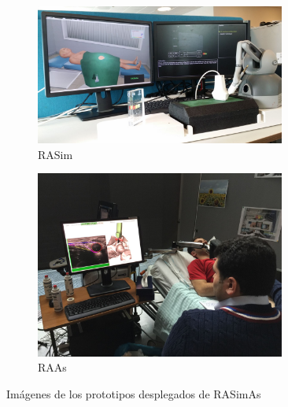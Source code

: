 \begin{figure}[ht]
  \centering
  \begin{subfigure}[b]{0.5\linewidth}
    \centering\includegraphics[width=0.9\textwidth]{IMG/sim3.jpg}
    \caption{\ac{RASim} \label{subfig:rasim}}
  \end{subfigure}%
  \begin{subfigure}[b]{0.5\linewidth}
    \centering\includegraphics[width=0.9\textwidth]{IMG/raas.JPG}
    \caption{\ac{RAAs} \label{subfig:raas}}
  \end{subfigure}
  \caption{Imágenes de los prototipos desplegados de \ac{RASimAs}}
\end{figure}


